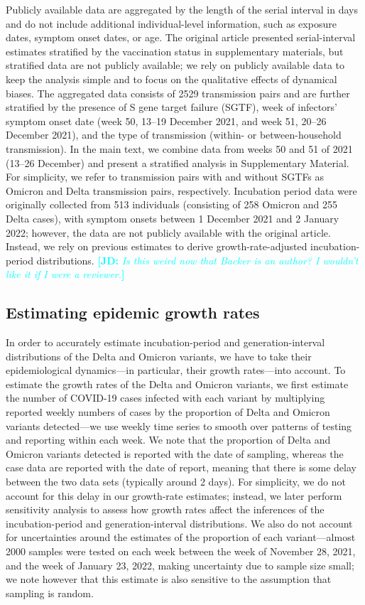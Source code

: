 \documentclass[12pt]{article}
\newcommand{\comment}{\showcomment}
\newcommand{\showcomment}[3]{\textcolor{#1}{\textbf{[#2: }\textsl{#3}\textbf{]}}}
\newcommand{\jd}[1]{\comment{cyan}{JD}{#1}}
\begin{document}
Publicly available data are aggregated by the length of the serial interval in days and do not include additional individual-level information, such as exposure dates, symptom onset dates, or age.
The original article presented serial-interval estimates stratified by the vaccination status in supplementary materials, but stratified data are not publicly available; we rely on publicly available data to keep the analysis simple and to focus on the qualitative effects of dynamical biases.
The aggregated data consists of 2529 transmission pairs and are further stratified by the presence of S gene target failure (SGTF), week of infectors' symptom onset date (week 50, 13--19 December 2021, and week 51, 20--26 December 2021), and the type of transmission (within- or between-household transmission).
In the main text, we combine data from weeks 50 and 51 of 2021 (13--26 December) and present a stratified analysis in Supplementary Material.
For simplicity, we refer to transmission pairs with and without SGTFs as Omicron and Delta transmission pairs, respectively.
Incubation period data were originally collected from 513 individuals (consisting of 258 Omicron and 255 Delta cases), with symptom onsets between 1 December 2021 and 2 January 2022;
however, the data are not publicly available with the original article. 
Instead, we rely on previous estimates \cite{backer2021omicron} to derive growth-rate-adjusted incubation-period distributions.
\jd{Is this weird now that Backer is an author? I wouldn't like it if I were a reviewer.}

\subsection{Estimating epidemic growth rates}

In order to accurately estimate incubation-period and generation-interval distributions of the Delta and Omicron variants, we have to take their epidemiological dynamics---in particular, their growth rates---into account.
To estimate the growth rates of the Delta and Omicron variants, we first estimate the number of COVID-19 cases infected with each variant by multiplying reported weekly numbers of cases by the proportion of Delta and Omicron variants detected---we use weekly time series to smooth over patterns of testing and reporting within each week. 
We note that the proportion of Delta and Omicron variants detected is reported with the date of sampling, whereas the case data are reported with the date of report, meaning that there is some delay between the two data sets (typically around 2 days).
For simplicity, we do not account for this delay in our growth-rate estimates; 
instead, we later perform sensitivity analysis to assess how growth rates affect the inferences of the incubation-period and generation-interval distributions.
We also do not account for uncertainties around the estimates of the proportion of each variant---almost 2000 samples were tested on each week between the week of November 28, 2021, and the week of January 23, 2022, making uncertainty due to sample size small;
we note however that this estimate is also sensitive to  the assumption that sampling is random.
\end{document}
